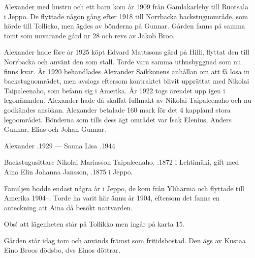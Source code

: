 Alexander med hustru och ett barn kom år 1909 från Gamlakarleby till Ruotsala i Jeppo. De flyttade någon gång efter 1918 till Norrbacka backstuguområde, som hörde till Tollicko, men ägdes av bönderna på Gunnar. Gården fanns på samma tomt som nuvarande gård nr 28 och revs av Jakob Broo.

Alexander hade före år 1925 köpt Edvard Mattssons gård på Hilli, flyttat den till Norrbacka och använt den som stall. Torde vara samma uthusbyggnad som nu finns kvar. År 1920 behandlades Alexander Saikkonens anhållan om att få lösa in backstuguområdet, men avslogs eftersom kontraktet blivit upprättat med Nikolai Taipaleenaho, som befann sig i Amerika. År 1922 togs ärendet upp igen i legonämnden. Alexander hade då skaffat fullmakt av Nikolai Taipaleenaho och nu godkändes ansökan. Alexander betalade 160 mark för det 4 kappland stora legoområdet. Bönderna som tills dess ägt området var Isak Elenius, Anders Gunnar, Elias och Johan Gunnar.

Alexander .1929  ---  Sanna Lisa .1944


Backstugusittare Nikolai Mariasson Taipaleenaho, .1872 i Lehtimäki, gift med Aina Elin Johanna Jansson, .1875 i Jeppo.
\begin{jhchildren}
  \item {}
  \item {}
  \item {}
\end{jhchildren}

Familjen bodde endast några år i Jeppo, de kom från Ylihärmä och flyttade till Amerika 1904--. Torde ha varit här ännu år 1904, eftersom det fanns en anteckning att Aina då besökt nattvarden.



Obs! att lägenheten står på Tollikko men ingår på karta 15.


Gården står idag tom och används främst som fritidsbostad. Den ägs av Kustaa Eino Broos dödsbo, dvs Einos döttrar.\jhvspace{}



